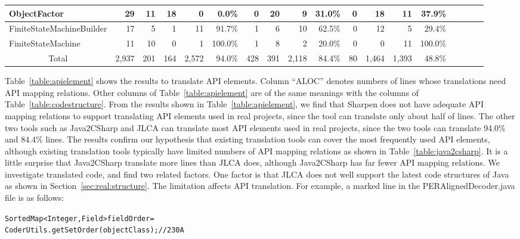 \begin{table*}[t]
\begin{SmallOut}
\begin {tabular} {|l|r|r|r|r|r|r|r|r|r|r|r|r|r|r|r|r|r|}
\hline
  ObjectFactor                 & 29   & 11 & 18  & 0   &  0.0\%& 0   & 20  & 9   & 31.0\% & 0  & 18& 11   & 37.9\%\\
\hline
  FiniteStateMachineBuilder    & 17   & 5  & 1   & 11  & 91.7\% & 1   & 6  & 10  & 62.5\% & 0  & 12& 5    & 29.4\%\\
\hline
  FiniteStateMachine           & 11   & 10 & 0   & 1   & 100.0\%& 1   & 8  & 2   &  20.0\%& 0  & 0 & 11   & 100.0\%\\
\hline\hline
   \multicolumn{1}{|c|}{Total} & 2,937 & 201& 164 &2,572 &  94.0\%& 428 & 391& 2,118&  84.4\%& 80 &1,464&1,393 & 48.8\%\\
\hline
\end{tabular}%
 \label{table:apielement}
\end{SmallOut}%
\end{table*}

Table~\ref{table:apielement} shows the results to translate API elements. Column ``ALOC'' denotes numbers of lines whose translations need API mapping relations. Other columns of Table~\ref{table:apielement} are of the same meanings with the columns of Table~\ref{table:codestructure}. From the results shown in Table~\ref{table:apielement}, we find that Sharpen does not have adequate API mapping relations to support translating API elements used in real projects, since the tool can translate only about half of lines. The other two tools such as Java2CSharp and JLCA can translate most API elements used in real projects, since the two tools can translate 94.0\% and 84.4\% lines. The results confirm our hypothesis that existing translation tools can cover the most frequently used API elements, although existing translation tools typically have limited numbers of API mapping relations as shown in Table~\ref{table:java2csharp}. It is a little surprise that Java2CSharp translate more lines than JLCA does, although Java2CSharp has far fewer API mapping relations. We investigate translated code, and find two related factors. One factor is that JLCA does not well support the latest code structures of Java as shown in Section~\ref{sec:real:structure}. The limitation affects API translation. For example, a marked line in the PERAlignedDecoder.java file is as follows:

\begin{CodeOut}%
\begin{alltt}
SortedMap<Integer,Field> fieldOrder =
        CoderUtils.getSetOrder(objectClass);//230A
\end{alltt}
\end{CodeOut}

